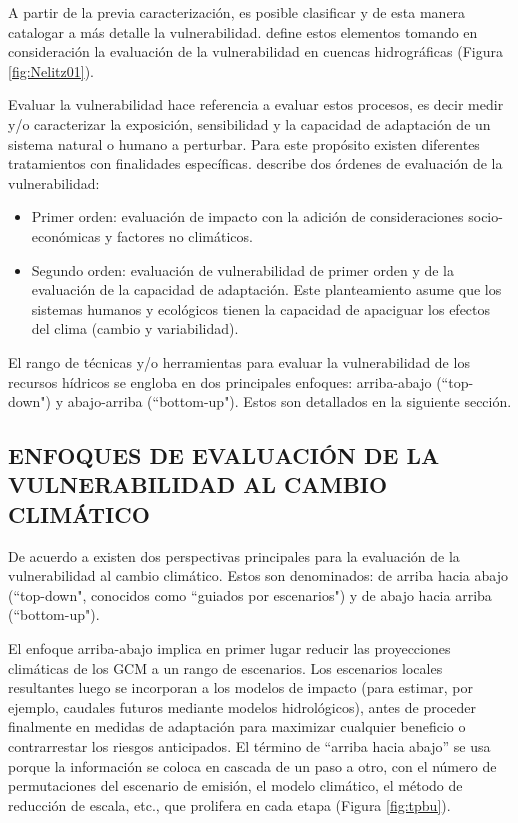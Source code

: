 \documentclass[12pt]{article}
\begin{document}
\clearpage
A partir de la previa caracterización, es posible clasificar y de esta manera catalogar a más detalle la vulnerabilidad. \citet{nelitz2013tools} define estos elementos tomando en consideración la evaluación de la vulnerabilidad en cuencas hidrográficas (Figura \ref{fig:Nelitz01}).

Evaluar la vulnerabilidad hace referencia a evaluar estos procesos, es decir medir y/o caracterizar la exposición, sensibilidad y la capacidad de adaptación de un sistema natural o humano a perturbar. Para este propósito existen diferentes tratamientos con finalidades específicas. \citet{nelitz2013tools} describe dos órdenes de evaluación de la vulnerabilidad:

\begin{itemize}
    \item Primer orden: evaluación de impacto con la adición de consideraciones socio-económicas y factores no climáticos.
    \item Segundo orden: evaluación de vulnerabilidad de primer orden y de la evaluación de la capacidad de adaptación. Este planteamiento asume que los sistemas humanos y ecológicos tienen la capacidad de apaciguar los efectos del clima (cambio y variabilidad).
\end{itemize}

El rango de técnicas y/o herramientas para evaluar la vulnerabilidad de los recursos hídricos se engloba en dos principales enfoques: arriba-abajo (“top-down") y abajo-arriba (“bottom-up"). Estos son detallados en la siguiente sección.

\subsection{ENFOQUES DE EVALUACIÓN DE LA VULNERABILIDAD AL CAMBIO CLIMÁTICO}

De acuerdo a \citet{Wilby2010} existen dos perspectivas principales para la evaluación de la vulnerabilidad al cambio climático. Estos son denominados: de arriba hacia abajo (“top-down", conocidos como ``guiados por escenarios") y de abajo hacia arriba (“bottom-up").

\clearpage

\clearpage

El enfoque arriba-abajo implica en primer lugar reducir las proyecciones climáticas de los GCM a un rango de escenarios. Los escenarios locales resultantes luego se incorporan a los modelos de impacto (para estimar, por ejemplo, caudales futuros mediante modelos hidrológicos), antes de proceder finalmente en medidas de adaptación para maximizar cualquier beneficio o contrarrestar los riesgos anticipados. El término de “arriba hacia abajo” se usa porque la información se coloca en cascada de un paso a otro, con el número de permutaciones del escenario de emisión, el modelo climático, el método de reducción de escala, etc., que prolifera en cada etapa (Figura \ref{fig:tpbu}). 
\end{document}
